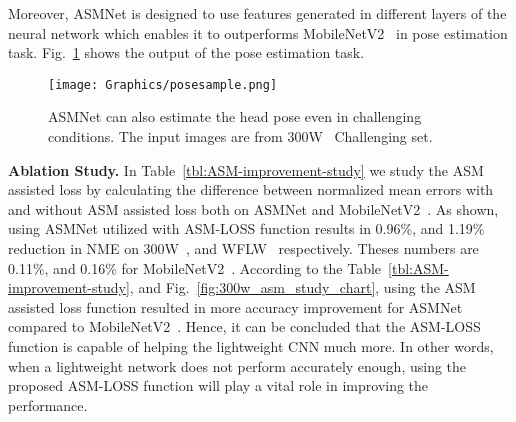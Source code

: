 \documentclass[final]{cvpr}
\begin{document}
Moreover, ASMNet is designed to use features generated in different layers of the neural network which enables it to outperforms MobileNetV2~\cite{sandler2018mobilenetv2} in pose estimation task. Fig.~\ref{fig:output_pose} shows the output of the pose estimation task.


\begin{figure}[t]
  \centering
  \texttt{[image: Graphics/posesample.png]}
  \caption{ASMNet can also estimate the head pose even in challenging conditions. The input images are from 300W~\cite{sagonas2013300} Challenging set.}
  \label{fig:output_pose}
\end{figure}


\textbf{Ablation Study.}
In Table~\ref{tbl:ASM-improvement-study} we study the ASM assisted loss by calculating the difference between normalized mean errors with and without ASM assisted loss both on ASMNet and MobileNetV2~\cite{sandler2018mobilenetv2}. As shown, using ASMNet utilized with ASM-LOSS function results in 0.96\%, and 1.19\% reduction in NME on 300W~\cite{sagonas2013300}, and WFLW~\cite{wu2018look} respectively. Theses numbers are 0.11\%, and 0.16\% for MobileNetV2~\cite{sandler2018mobilenetv2}. According to the Table~\ref{tbl:ASM-improvement-study}, and Fig.~\ref{fig:300w_asm_study_chart}, using the ASM assisted loss function resulted in more accuracy improvement for ASMNet compared to MobileNetV2~\cite{sandler2018mobilenetv2}. Hence, it can be concluded that the ASM-LOSS function is capable of helping the lightweight CNN much more. In other words, when a lightweight network does not perform accurately enough, using the proposed ASM-LOSS function will play a vital role in improving the performance.

\begin{table}[]
\caption{ Model size (the number of model parameters) and computational cost (FLOPs) analysis of different networks.}
\centering
\small
{}
\end{table}
\end{document}
